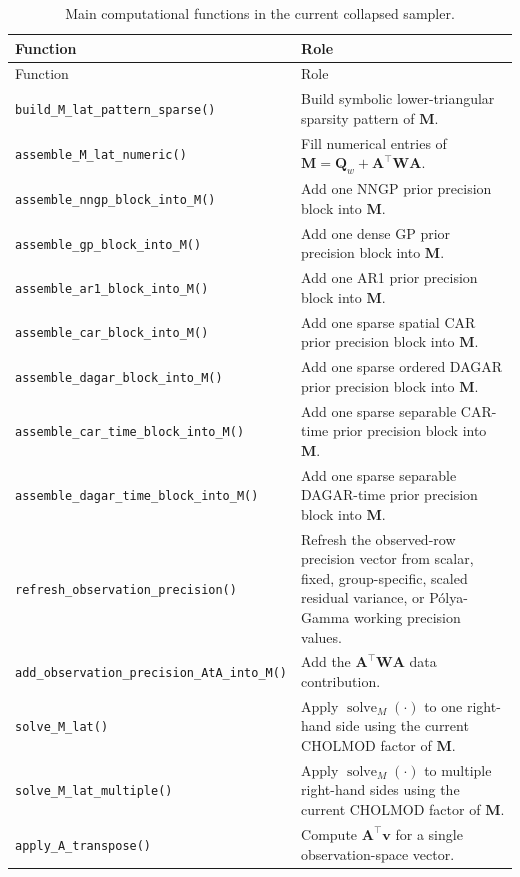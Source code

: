 \documentclass[11pt]{article}
\newcommand{\bv}{\bm{v}}
\newcommand{\bA}{\bm{A}}
\newcommand{\bM}{\bm{M}}
\newcommand{\bQ}{\bm{Q}}
\newcommand{\bW}{\bm{W}}
\newcommand{\trans}{^\top}
\begin{document}
\begin{longtable}{p{}p{}}
\caption{Main computational functions in the current collapsed sampler.}
\label{tab:funmap}\\
\toprule
Function & Role \\
\midrule
\endfirsthead
\toprule
Function & Role \\
\midrule
\endhead
\texttt{build\_M\_lat\_pattern\_sparse()} &
  Build symbolic lower-triangular sparsity pattern of $\bM$. \\
\texttt{assemble\_M\_lat\_numeric()} &
  Fill numerical entries of $\bM = \bQ_w + \bA\trans \bW \bA$. \\
\texttt{assemble\_nngp\_block\_into\_M()} &
  Add one NNGP prior precision block into $\bM$. \\
\texttt{assemble\_gp\_block\_into\_M()} &
  Add one dense GP prior precision block into $\bM$. \\
\texttt{assemble\_ar1\_block\_into\_M()} &
  Add one AR1 prior precision block into $\bM$. \\
\texttt{assemble\_car\_block\_into\_M()} &
  Add one sparse spatial CAR prior precision block into $\bM$. \\
\texttt{assemble\_dagar\_block\_into\_M()} &
  Add one sparse ordered DAGAR prior precision block into $\bM$. \\
\texttt{assemble\_car\_time\_block\_into\_M()} &
  Add one sparse separable CAR-time prior precision block into $\bM$. \\
\texttt{assemble\_dagar\_time\_block\_into\_M()} &
  Add one sparse separable DAGAR-time prior precision block into $\bM$. \\
\texttt{refresh\_observation\_precision()} &
  Refresh the observed-row precision vector from scalar, fixed,
  group-specific, scaled residual variance, or P{\'o}lya-Gamma working precision values. \\
\texttt{add\_observation\_precision\_AtA\_into\_M()} &
  Add the $\bA\trans \bW \bA$ data contribution. \\
\texttt{solve\_M\_lat()} & Apply $\operatorname{solve}_M(\cdot)$ to one right-hand side using the current CHOLMOD factor of $\bM$. \\
\texttt{solve\_M\_lat\_multiple()} & Apply $\operatorname{solve}_M(\cdot)$ to multiple right-hand sides using the current CHOLMOD factor of $\bM$. \\
\texttt{apply\_A\_transpose()} &
  Compute $\bA\trans\bv$ for a single observation-space vector. \\

\end{longtable}
\end{document}
